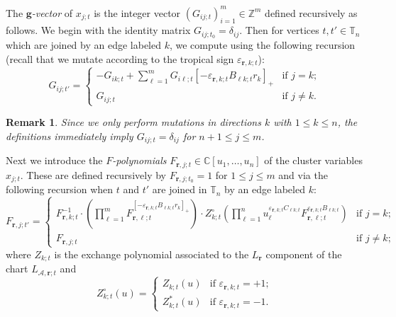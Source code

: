 \documentclass{amsart}
\newtheorem{remark}[theorem]{Remark}
\numberwithin{equation}{section}
\newcommand{\bfg}{\mathbf{g}}
\newcommand{\bfr}{{\boldsymbol{r}}}
\newcommand{\cA}{\mathcal{A}}
\newcommand{\CC}{\mathbb{C}}
\newcommand{\TT}{\mathbb{T}}
\newcommand{\ZZ}{\mathbb{Z}}
\begin{document}
The \emph{$\bfg$-vector} of $x_{j;t}$ is the integer vector $(G_{ij;t})_{i=1}^m\in\ZZ^m$ defined recursively as follows.
We begin with the identity matrix $G_{ij;t_0}=\delta_{ij}$.
Then for vertices $t,t'\in\TT_n$ which are joined by an edge labeled $k$, we compute using the following recursion (recall that we mutate according to the tropical sign $\varepsilon_{\bfr,k;t}$):
\begin{equation}
  \label{eq:g-matrix mutation}
  G_{ij;t'}=
  \begin{cases}
    -G_{ik;t}+\sum\limits_{\ell=1}^m G_{i\ell;t}[-\varepsilon_{\bfr,k;t} B_{\ell k;t} r_k]_+ & \text{if $j=k$;}\\
    G_{ij;t} & \text{if $j\ne k$.}
  \end{cases}
\end{equation}
\begin{remark}
  Since we only perform mutations in directions $k$ with $1\le k\le n$, the definitions immediately imply $G_{ij;t}=\delta_{ij}$ for $n+1\le j\le m$.
\end{remark}
Next we introduce the \emph{$F$-polynomials} $F_{\bfr,j;t}\in\CC[u_1,\ldots,u_n]$ of the cluster variables $x_{j;t}$.
These are defined recursively by $F_{\bfr,j;t_0}=1$ for $1\le j\le m$ and via the following recursion when $t$ and $t'$ are joined in $\TT_n$ by an edge labeled $k$:
\begin{equation}
  \label{eq:F-polynomial mutation}
  F_{\bfr,j;t'}=
  \begin{cases}
    F_{\bfr,k;t}^{-1}\cdot \left(\prod_{\ell=1}^m F_{\bfr,\ell;t}^{[-\varepsilon_{\bfr,k;t} B_{\ell k;t} r_k]_+}\right) \cdot Z_{k;t}^\circ\left(\prod_{\ell=1}^n u_\ell^{\varepsilon_{\bfr,k;t} C_{\ell k;t}} F_{\bfr,\ell;t}^{\varepsilon_{\bfr,k;t} B_{\ell k;t}}\right) & \text{if $j=k$;}\\
    F_{\bfr,j;t} & \text{if $j\ne k$;}
  \end{cases}
\end{equation}
where $Z_{k;t}$ is the exchange polynomial associated to the $L_\bfr$ component of the chart $L_{\cA,\bfr;t}$ and
\[ Z_{k;t}^\circ(u)=\begin{cases} Z_{k;t}(u) & \text{if $\varepsilon_{\bfr,k;t}=+1$;}\\ Z_{k;t}^*(u) & \text{if $\varepsilon_{\bfr,k;t}=-1$.} \end{cases}\]
\end{document}
